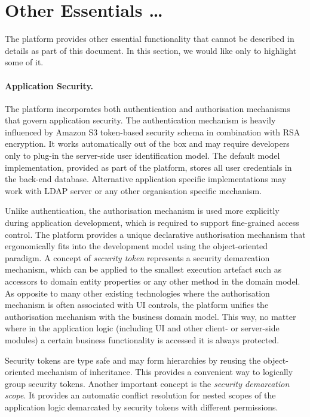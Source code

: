 \section{Other Essentials \ldots}\label{sec:07}

  The platform provides other essential functionality that cannot be described in details as part of this document.
  In this section, we would like only to highlight some of it.

\paragraph{Application Security.}

  The platform incorporates both authentication and authorisation mechanisms that govern application security.
  The authentication mechanism is heavily influenced by Amazon S3 token-based security schema in combination with RSA encryption.
  It works automatically out of the box and may require developers only to plug-in the server-side user identification model.
  The default model implementation, provided as part of the platform, stores all user credentials in the back-end database.
  Alternative application specific implementations may work with LDAP server or any other organisation specific mechanism.
  
  Unlike authentication, the authorisation mechanism is used more explicitly during application development, which is required to support fine-grained access control.
  The platform provides a unique declarative authorisation mechanism that ergonomically fits into the development model using the object-oriented paradigm.
  A concept of \emph{security token} represents a security demarcation mechanism, which can be applied to the smallest execution artefact such as accessors to domain entity properties or any other method in the domain model.
  As opposite to many other existing technologies where the authorisation mechanism is often associated with UI controls, the platform unifies the authorisation mechanism with the business domain model.
  This way, no matter where in the application logic (including UI and other client- or server-side modules) a certain business functionality is accessed it is always protected.
  
  Security tokens are type safe and may form hierarchies by reusing the object-oriented mechanism of inheritance.
  This provides a convenient way to logically group security tokens.
  Another important concept is the \emph{security demarcation scope}.
  It provides an automatic conflict resolution for nested scopes of the application logic demarcated by security tokens with different permissions.
 
